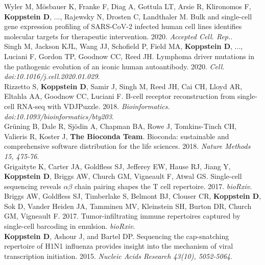 \documentclass[10pt,a4paper]{article}
\begin{document}
{\noindent Wyler M, Mösbauer K, Franke F, Diag A, Gottula LT, Arsie R, Klironomos F, \textbf{Koppstein D}, ..., Rajewsky N, Drosten C, Landthaler M. Bulk and single-cell gene expression profiling of SARS-CoV-2 infected human cell lines identifies molecular targets for therapeutic intervention. 2020. \textit{Accepted Cell. Rep.}. \vspace{0.5em} \\
{\noindent Singh M, Jackson KJL, Wang JJ, Schofield P, Field MA, \textbf{Koppstein D}, ..., Luciani F, Gordon TP, Goodnow CC, Reed JH. Lymphoma driver mutations in the pathogenic evolution of an iconic human autoantibody. 2020. \textit{Cell. doi:10.1016/j.cell.2020.01.029}. \vspace{0.5em} \\
{\noindent Rizzetto S, \textbf{Koppstein D}, Samir J, Singh M, Reed JH, Cai CH, Lloyd AR, Eltahla AA, Goodnow CC, Luciani F. B-cell receptor reconstruction from single-cell RNA-seq with VDJPuzzle. 2018. \textit{Bioinformatics. doi:10.1093/bioinformatics/bty203}. \vspace{0.5em} \\
{\noindent Grüning B, Dale R, Sjödin A, Chapman BA, Rowe J, Tomkins-Tinch CH, Valieris R, Koster J, \textbf{The Bioconda Team}. Bioconda: sustainable and comprehensive software distribution for the life sciences. 2018. \textit{Nature Methods 15, 475-76}.} \vspace{0.4em} \\
{\noindent Grigaityte K, Carter JA, Goldfless SJ, Jefferey EW, Hause RJ, Jiang Y, \textbf{Koppstein D}, Briggs AW, Church GM, Vigneault F, Atwal GS. Single-cell sequencing reveals $\alpha \beta$ chain pairing shapes the T cell repertoire. 2017. \textit{bioRxiv}.} \vspace{-0.8em} \\
{\noindent Briggs AW, Goldfless SJ, Timberlake S, Belmont BJ, Clouser CR, \textbf{Koppstein D}, Sok D, Vander Heiden JA, Tamminen MV, Kleinstein SH, Burton DR, Church GM, Vigneault F. 2017. Tumor-infiltrating immune repertoires captured by single-cell barcoding in emulsion. \textit{bioRxiv}. \vspace{0.5em} \\
{\noindent \textbf{Koppstein D}, Ashour J, and Bartel DP. Sequencing the cap-snatching repertoire of H1N1
influenza provides insight into the mechanism of viral transcription initiation. 2015. \textit{Nucleic Acids Research 43(10), 5052-5064}.} \vspace{0.5em} \\
}}}}
\end{document}
